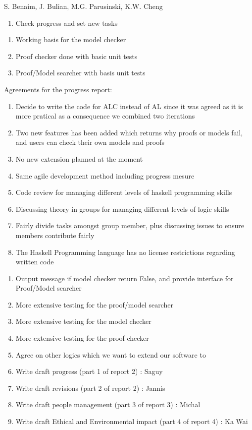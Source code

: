 %
{S. Benaim, J. Bulian, M.G. Parusinski, K.W. Cheng}%
{\begin{enumerate} 
\item Check progress and set new tasks
\end{enumerate} }%
{\begin{enumerate}
\item Working basis for the model checker
\item Proof checker done with basic unit tests
\item Proof/Model searcher with basis unit tests
\end{enumerate}}%
{Agreements for the progress report: \begin{enumerate}
\item Decide to write the code for ALC instead of AL since it was agreed as it is more pratical as a consequence we combined two iterations
\item Two new features has been added which returns why proofs or models fail, and users can check their own models and proofs
\item No new extension planned at the moment
\item Same agile development method including progress mesure
\item Code review for managing different levels of haskell programming skills
\item Discussing theory in groups for managing different levels of logic skills
\item Fairly divide tasks amongst group member, plus discussing issues to ensure members contribute fairly
\item The Haskell Programming language has no license restrictions regarding written code
\end{enumerate}}
{\begin{enumerate}
\item Output message if model checker return False, and provide interface for Proof/Model searcher
\item More extensive testing for the proof/model searcher
\item More extensive testing for the model checker
\item More extensive testing for the proof checker
\item Agree on other logics which we want to extend our software to
\item Write draft progress (part 1 of report 2) : Saguy
\item Write draft revisions (part 2 of report 2) : Jannis
\item Write draft people management (part 3 of report 3) : Michal
\item Write draft Ethical and Environmental impact (part 4 of report 4) : Ka Wai
\end{enumerate}}%

